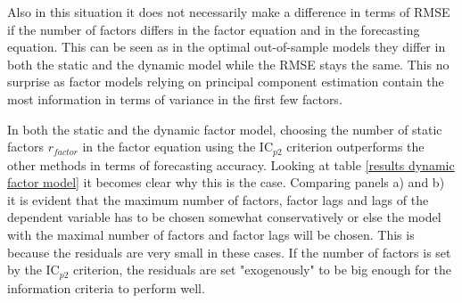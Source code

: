 \documentclass[12pt]{article}
\begin{document}
Also in this situation it does not necessarily make a difference in terms of RMSE if the number of factors differs in the factor equation and in the forecasting equation. This can be seen as in the optimal out-of-sample models they differ in both the static and the dynamic model while the RMSE stays the same. This no surprise as factor models relying on principal component estimation contain the most information in terms of variance in the first few factors.

In both the static and the dynamic factor model, choosing the number of static factors $r_{factor}$ in the factor equation using the IC$_{p2}$ criterion outperforms the other methods in terms of forecasting accuracy. Looking at table \ref{results dynamic factor model} it becomes clear why this is the case. Comparing panels a) and b) it is evident that the maximum number of factors, factor lags and lags of the dependent variable has to be chosen somewhat conservatively or else the model with the maximal number of factors and factor lags will be chosen. This is because the residuals are very small in these cases. If the number of factors is set by the IC$_{p2}$ criterion, the residuals are set "exogenously" to be big enough for the information criteria to perform well.
\end{document}
